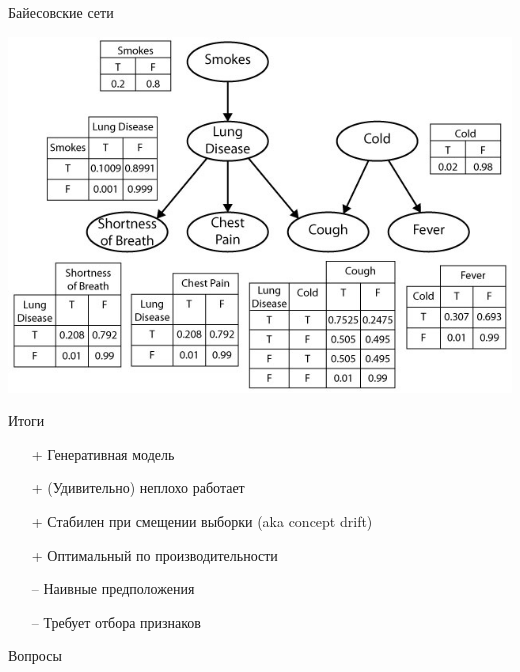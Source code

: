 \documentclass[aspectratio=169]{beamer}
\begin{document}
\begin{frame}{Байесовские сети}

\begin{center}
\includegraphics[scale=0.4]{images/network.jpg}
\end{center}

\end{frame}


\begin{frame}{Итоги}

\begin{itemize}
\item[+] Генеративная модель
\item[+] (Удивительно) неплохо работает
\item[+] Стабилен при смещении выборки (aka concept drift)
\item[+] Оптимальный по производительности
\end{itemize}

\begin{itemize}
\item[--] Наивные предположения
\item[--] Требует отбора признаков
\end{itemize}

\end{frame}


\begin{frame}{}

\begin{center}
\Large Вопросы
\end{center}

\end{frame}
\end{document}
